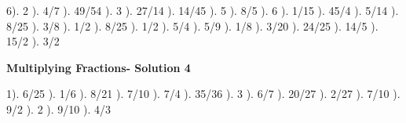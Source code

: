\documentclass{article}%
\begin{document}
6). 2%
). 4/7%
). 49/54%
). 3%
). 27/14%
). 14/45%
). 5%
). 8/5%
). 6%
). 1/15%
). 45/4%
). 5/14%
). 8/25%
). 3/8%
). 1/2%
). 8/25%
). 1/2%
). 5/4%
). 5/9%
). 1/8%
). 3/20%
). 24/25%
). 14/5%
). 15/2%
). 3/2%
\newline%
\newpage%
\large%
\begin{center}%
\textbf{Multiplying Fractions- Solution 4}%
\newline%
\end{center} \normalsize%
1). 6/25%
). 1/6%
). 8/21%
). 7/10%
). 7/4%
). 35/36%
). 3%
). 6/7%
). 20/27%
). 2/27%
). 7/10%
). 9/2%
). 2%
). 9/10%
). 4/3%
\newline%
\end{document}

